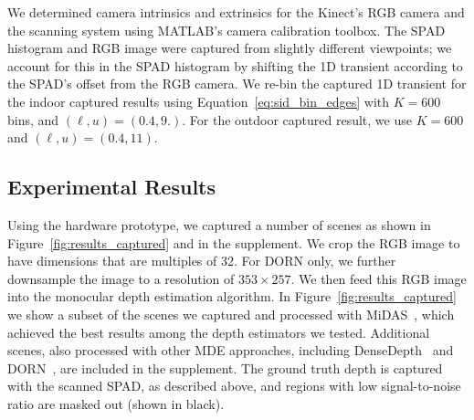 We determined camera intrinsics and extrinsics for the Kinect's RGB camera and
the scanning system using MATLAB's camera calibration toolbox. 
The SPAD histogram and RGB image were captured from slightly different
viewpoints; we account for this in the SPAD histogram by shifting the 1D
transient according to the SPAD's offset from the RGB camera. We re-bin the
captured 1D transient for the indoor captured results
using Equation~\ref{eq:sid_bin_edges} with $K = 600$ bins, and $(\ell, u)=(0.4, 9.)$.
For the outdoor captured result, we use $K=600$ and $(\ell, u)=(0.4, 11)$.

%

\subsection{Experimental Results}

Using the hardware prototype, we captured a number of scenes as shown in
Figure~\ref{fig:results_captured} and in the supplement. We crop the RGB image
to have dimensions that are multiples of 32. For DORN only, we further
downsample the image to a resolution of $353 \times 257$. We then feed this RGB
image into the monocular depth estimation algorithm. In
Figure~\ref{fig:results_captured} we show a subset of the scenes we captured and
processed with MiDAS~\cite{Lasinger:2019}, which achieved the best results among
the depth estimators we tested. Additional scenes, also processed with other MDE
approaches, including DenseDepth~\cite{Alhashim2018} and DORN~\cite{Fu2018}, are
included in the supplement. The ground truth depth is captured with the scanned
SPAD, as described above, and regions with low signal-to-noise ratio are masked
out (shown in black).

